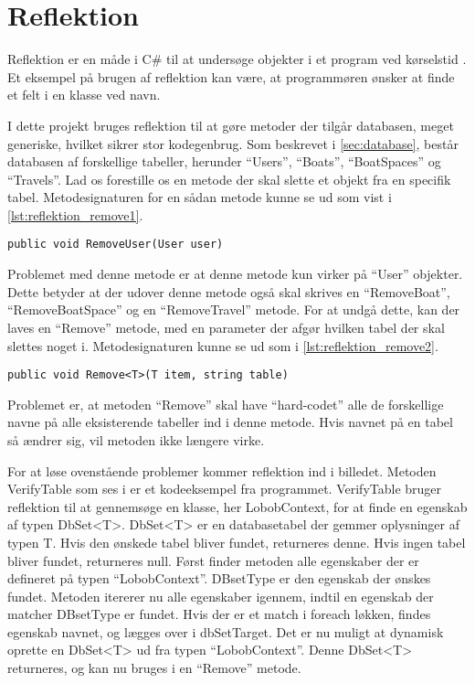 \section{Reflektion}
\label{sec:reflektion}

Reflektion er en måde i C\# til at undersøge objekter i et program ved kørselstid \cite{michaelis2012essential}. Et eksempel på brugen af reflektion kan være, at programmøren ønsker at finde et felt i en klasse ved navn.

I dette projekt bruges reflektion til at gøre metoder der tilgår databasen, meget generiske, hvilket sikrer stor kodegenbrug. Som beskrevet i \cref{sec:database}, består databasen af forskellige tabeller, herunder \enquote{Users}, \enquote{Boats}, \enquote{BoatSpaces} og \enquote{Travels}. Lad os forestille os en metode der skal slette et objekt fra en specifik tabel. Metodesignaturen for en sådan metode kunne se ud som vist i \cref{lst:reflektion_remove1}.


\begin{lstlisting}[label=lst:reflektion_remove1]
public void RemoveUser(User user)
\end{lstlisting}

Problemet med denne metode er at denne metode kun virker på \enquote{User} objekter. Dette betyder at der udover denne metode også skal skrives en \enquote{RemoveBoat}, \enquote{RemoveBoatSpace} og en \enquote{RemoveTravel} metode. For at undgå dette, kan der laves en \enquote{Remove} metode, med en parameter der afgør hvilken tabel der skal slettes noget i. Metodesignaturen kunne se ud som i \cref{lst:reflektion_remove2}.


\begin{lstlisting}[label=lst:reflektion_remove2]
public void Remove<T>(T item, string table)
\end{lstlisting}

Problemet er, at metoden \enquote{Remove} skal have \enquote{hard-codet} alle de forskellige navne på alle eksisterende tabeller ind i denne metode. Hvis navnet på en tabel så ændrer sig, vil metoden ikke længere virke.

For at løse ovenstående problemer kommer reflektion ind i billedet. Metoden VerifyTable som ses i  er et kodeeksempel fra programmet. VerifyTable bruger reflektion til at gennemsøge en klasse, her LobobContext, for at finde en egenskab af typen DbSet<T>. DbSet<T> er en databasetabel der gemmer oplysninger af typen T. Hvis den ønskede tabel bliver fundet, returneres denne. Hvis ingen tabel bliver fundet, returneres null. Først finder metoden alle egenskaber der er defineret på typen \enquote{LobobContext}. DBsetType er den egenskab der ønskes fundet. Metoden itererer nu alle egenskaber igennem, indtil en egenskab der matcher DBsetType er fundet. Hvis der er et match i foreach løkken, findes egenskab navnet, og lægges over i dbSetTarget. Det er nu muligt at dynamisk oprette en DbSet<T> ud fra typen \enquote{LobobContext}. Denne DbSet<T> returneres, og kan nu bruges i en \enquote{Remove} metode.


